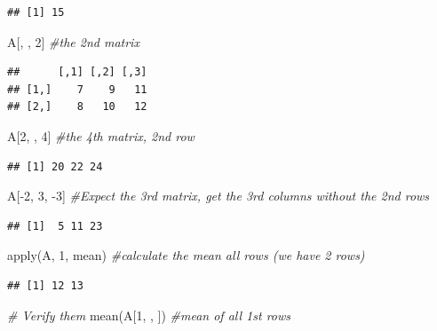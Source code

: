 \documentclass[
]{book}
\newenvironment{Shaded}{\begin{snugshade}}{\end{snugshade}}
\newcommand{\CommentTok}[1]{\textcolor[rgb]{0.56,0.35,0.01}{\textit{#1}}}
\newcommand{\DecValTok}[1]{\textcolor[rgb]{0.00,0.00,0.81}{#1}}
\newcommand{\FunctionTok}[1]{\textcolor[rgb]{0.00,0.00,0.00}{#1}}
\newcommand{\NormalTok}[1]{#1}
\newcommand{\SpecialCharTok}[1]{\textcolor[rgb]{0.00,0.00,0.00}{#1}}
\begin{document}
\begin{verbatim}
## [1] 15
\end{verbatim}

\begin{Shaded}
\begin{Highlighting}[]
\NormalTok{A[, , }\DecValTok{2}\NormalTok{]       }\CommentTok{\#the 2nd matrix}
\end{Highlighting}
\end{Shaded}

\begin{verbatim}
##      [,1] [,2] [,3]
## [1,]    7    9   11
## [2,]    8   10   12
\end{verbatim}

\begin{Shaded}
\begin{Highlighting}[]
\NormalTok{A[}\DecValTok{2}\NormalTok{, , }\DecValTok{4}\NormalTok{]      }\CommentTok{\#the 4th matrix, 2nd row}
\end{Highlighting}
\end{Shaded}

\begin{verbatim}
## [1] 20 22 24
\end{verbatim}

\begin{Shaded}
\begin{Highlighting}[]
\NormalTok{A[}\SpecialCharTok{{-}}\DecValTok{2}\NormalTok{, }\DecValTok{3}\NormalTok{, }\SpecialCharTok{{-}}\DecValTok{3}\NormalTok{]   }\CommentTok{\#Expect the 3rd matrix, get the 3rd columns without the 2nd rows}
\end{Highlighting}
\end{Shaded}

\begin{verbatim}
## [1]  5 11 23
\end{verbatim}

\begin{Shaded}
\begin{Highlighting}[]
\FunctionTok{apply}\NormalTok{(A, }\DecValTok{1}\NormalTok{, mean)      }\CommentTok{\#calculate the mean all rows (we have 2 rows)}
\end{Highlighting}
\end{Shaded}

\begin{verbatim}
## [1] 12 13
\end{verbatim}

\begin{Shaded}
\begin{Highlighting}[]
\CommentTok{\# Verify them}
\FunctionTok{mean}\NormalTok{(A[}\DecValTok{1}\NormalTok{, , ])         }\CommentTok{\#mean of all 1st rows}
\end{Highlighting}
\end{Shaded}
\end{document}
